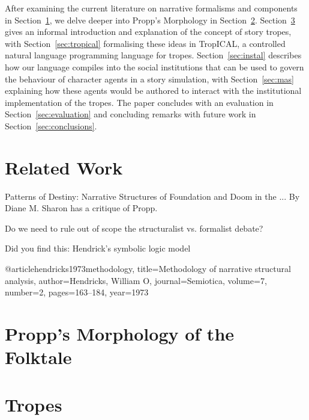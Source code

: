 \documentclass{article}
\begin{document}
After examining the current literature on narrative
formalisms and components in Section~\ref{sec:related}, we delve deeper into
Propp's Morphology in Section~\ref{sec:morphology}. Section~\ref{sec:tropes}
gives an informal introduction and explanation of the concept of story tropes,
with Section~\ref{sec:tropical} formalising these ideas in TropICAL, a
controlled natural language programming language for tropes.
Section~\ref{sec:instal} describes how our language compiles into the social
institutions that can be used to govern the behaviour of character agents in a
story simulation, with Section~\ref{sec:mas} explaining how these agents would
be authored to interact with the institutional implementation of the tropes. The
paper concludes with an evaluation in Section~\ref{sec:evaluation} and
concluding remarks with future work in Section~\ref{sec:conclusions}.

\section{Related Work}
\label{sec:related}

Patterns of Destiny: Narrative Structures of Foundation and Doom in the ...
By Diane M. Sharon has a critique of Propp.

Do we need to rule out of scope the structuralist vs. formalist debate?

Did you find this: Hendrick's symbolic logic model

@article{hendricks1973methodology,
  title={Methodology of narrative structural analysis},
  author={Hendricks, William O},
  journal={Semiotica},
  volume={7},
  number={2},
  pages={163--184},
  year={1973}
}

\section{Propp's Morphology of the Folktale}
\label{sec:morphology}

\section{Tropes}
\label{sec:tropes}
\end{document}

